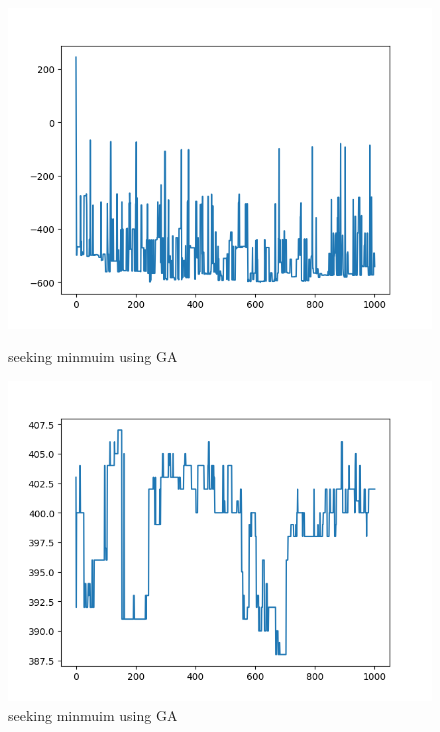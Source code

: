 \documentclass[11pt]{article} %
\begin{document}
\begin{figure}[h]
\centering
\begin{minipage}[t]{0.48\textwidth}
\includegraphics[scale=0.48]{GA_c0.1_m0.01_-602.png}
\caption{seeking minmuim using GA}
\end{minipage}
\begin{minipage}[t]{0.48\textwidth}
\includegraphics[scale=0.48]{GA_c0.1_m0.01_407.png}
\caption{seeking minmuim using GA}
\end{minipage}
\end{figure}
\end{document}
